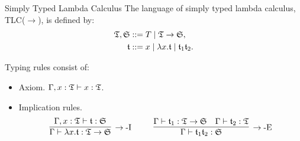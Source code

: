 \begin{frame}{Simply Typed Lambda Calculus}
    The language of simply typed lambda calculus, TLC($\rightarrow$), is defined by:
    \begin{align*}
    \mathfrak{T}, \mathfrak{S} &::= T \mid \mathfrak{T} \rightarrow \mathfrak{S}, \\
    \mathfrak{t} &::= x \mid \lambda x. \mathfrak{t} \mid \mathfrak{t}_1 \mathfrak{t}_2.
    \end{align*}
    
    Typing rules consist of:
    \begin{itemize}
        \item Axiom. $\Gamma, x : \mathfrak{T} \vdash x : \mathfrak{T}$.
        \item Implication rules.
        \[
        \infer[\rightarrow\mbox{-I}]{\Gamma \vdash \lambda x. \t : \T \rightarrow \mathfrak{S}}{\Gamma, x : \T \vdash \t : \mathfrak{S}}
        ~~~~ ~~~~
        \infer[\rightarrow\mbox{-E}]{\Gamma \vdash \t_1\t_2 : \mathfrak{S}}{
            \Gamma \vdash \t_1 : \T \rightarrow \mathfrak{S}
            &
            \Gamma \vdash \t_2 : \T
        }
        \]
    \end{itemize}
\end{frame}

